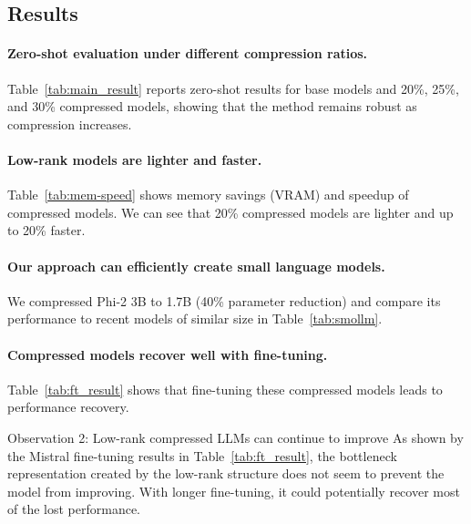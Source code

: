 \subsection{Results}
\paragraph{Zero-shot evaluation under different compression ratios.}
Table~\ref{tab:main_result} reports zero-shot results for base models and 20\%, 25\%, and 30\% compressed models, showing that the method remains robust as compression increases.

\paragraph{Low-rank models are lighter and faster.}
Table~\ref{tab:mem-speed} shows memory savings (VRAM) and speedup of compressed models. We can see that 20\% compressed models are lighter and up to 20\% faster.

\paragraph{Our approach can efficiently create small language models.}
We compressed Phi-2 3B to 1.7B (40\% parameter reduction) and compare its performance to recent models of similar size in Table~\ref{tab:smollm}.

\paragraph{Compressed models recover well with fine-tuning.}
Table~\ref{tab:ft_result} shows that fine-tuning these compressed models leads to performance recovery.

\begin{insightbox}{Observation 2: Low-rank compressed LLMs can continue to improve}
As shown by the Mistral fine-tuning results in Table~\ref{tab:ft_result}, the bottleneck representation created by the low-rank structure does not seem to prevent the model from improving. With longer fine-tuning, it could potentially recover most of the lost performance.
\end{insightbox}

